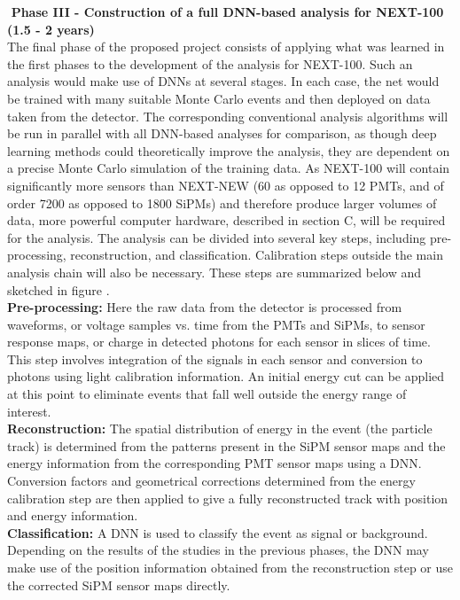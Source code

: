 \documentclass[11pt,a4paper]{article}
\begin{document}
\noindent\textbf{\textbullet\,\,Phase III - Construction of a full DNN-based analysis for NEXT-100 (1.5 - 2 years)}\\
The final phase of the proposed project consists of applying what was learned in the first phases to the development of the analysis for NEXT-100. Such an analysis would make use of DNNs at several stages. In each case, the net would be trained with many suitable Monte Carlo events and then deployed on data taken from the detector. The corresponding conventional analysis algorithms will be run in parallel with all DNN-based analyses for comparison, as though deep learning methods could theoretically improve the analysis, they are dependent on a precise Monte Carlo simulation of the training data. As NEXT-100 will contain significantly more sensors than NEXT-NEW (60 as opposed to 12 PMTs, and of order 7200 as opposed to 1800 SiPMs) and therefore produce larger volumes of data, more powerful computer hardware, described in section C, will be required for the analysis. The analysis can be divided into several key steps, including pre-processing, reconstruction, and classification. Calibration steps outside the main analysis chain will also be necessary. These steps are summarized below and sketched in figure .\\

\noindent\textbf{Pre-processing:} Here the raw data from the detector is processed from waveforms, or voltage samples vs. time from the PMTs and SiPMs, to sensor response maps, or charge in detected photons for each sensor in slices of time. This step involves integration of the signals in each sensor and conversion to photons using light calibration information. An initial energy cut can be applied at this point to eliminate events that fall well outside the energy range of interest.\\

\noindent\textbf{Reconstruction:} The spatial distribution of energy in the event (the particle track) is determined from the patterns present in the SiPM sensor maps and the energy information from the corresponding PMT sensor maps using a DNN. Conversion factors and geometrical corrections determined from the energy calibration step are then applied to give a fully reconstructed track with position and energy information.\\

\noindent\textbf{Classification:} A DNN is used to classify the event as signal or background. Depending on the results of the studies in the previous phases, the DNN may make use of the position information obtained from the reconstruction step or use the corrected SiPM sensor maps directly.\\
\end{document}
